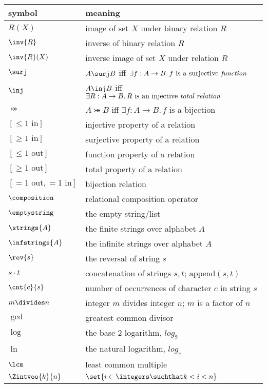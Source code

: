 \begin{center}
\begin{tabular}{ll}
symbol         &  meaning\\
\hline
$R(X)$         & image of set $X$ under binary relation $R$\\
$\inv{R}$      & inverse of binary relation $R$\\
$\inv{R}(X)$   & inverse image of set $X$ under relation $R$\\
$\surj$        & $A \surj B$ iff $\exists f:A \to B.\, f\text{ is a
  surjective \emph{function}}$\\
$\inj$         & $A \inj B$ iff $\exists R:A \to B.\, R\text{ is an
  injective \emph{total relation}}$\\
$\bij$         & $A \bij B$ iff $\exists f:A \to B.\, f\text{ is a
  bijection}$\\
$[\leq 1\text{ in}]$  & injective property of a relation\\
$[\geq 1\text{ in}]$  & surjective property of a relation\\
$[\leq 1\text{ out}]$  & function property of a relation\\
$[\geq 1\text{ out}]$  & total property of a relation\\
$[= 1\text{ out}, = 1\text{ in}]$  & bijection relation\\
$\composition$ & relational composition operator\\
$\emptystring$ & the empty string/list\\
$\strings{A}$  & the finite strings over alphabet $A$\\
$\infstrings{A}$ & the infinite strings over alphabet $A$\\
$\rev{s}$      & the reversal of string $s$\\
$s \cdot t$    & concatenation of strings $s,t$; $\text{append}(s,t)$\\
$\cnt{c}{s}$   & number of occurrences of character $c$ in string $s$\\
$m \divides n$ & integer $m$ divides integer $n$; $m$ is a factor of $n$\\
$\gcd$         & greatest common divisor\\
$\log$         & the base 2 logarithm, $log_2$\\
$\ln$          & the natural logarithm, $log_e$\\
$\lcm$         & least common multiple\\
$\Zintvoo{k}{n}$ & $\set{i \in \integers \suchthat k < i < n}$\\ %

\end{tabular}
\end{center}
